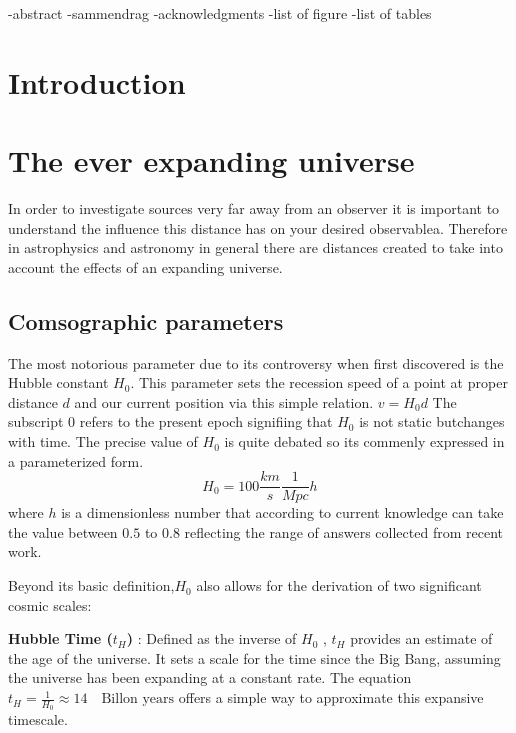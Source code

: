 \documentclass{article}
\begin{document}
\newpage
\tableofcontents

\newpage
\listoffigures

\listoftables

-abstract 
-sammendrag
-acknowledgments
-list of figure
-list of tables

\newpage

\section{Introduction}

\section{The ever expanding universe}
In order to investigate sources very far away from an observer it is important to understand the influence this distance 
has on your desired observablea. Therefore in astrophysics and astronomy in general there are distances created to take into account the effects of an expanding universe. 


\subsection{Comsographic parameters}

The most notorious parameter due to its controversy when first discovered is the Hubble constant $H_0$. 
This parameter sets the recession speed of a point at proper distance $d$ and our current position via this simple relation. $v = H_0 d$ 
The subscript $0$ refers to the present epoch signifiing that $H_0$ is not static butchanges with time. 
The precise value of $H_0$ is quite debated so its commenly expressed in a parameterized form. 
$$
H_0= 100\frac{km}{s}\frac{1}{Mpc} h 
$$
where $h$ is a dimensionless number that according to current knowledge  can take the value between $0.5$ to $0.8$ reflecting the range of answers collected from recent work. 

Beyond its basic definition,$H_0$ also allows for the derivation of two significant cosmic scales:

\textbf{Hubble Time ($t_H$) }: Defined as the inverse of 
$H_0$ , $t_H$ provides an estimate of the age of the universe. 
It sets a scale for the time since the Big Bang, assuming the universe has been expanding at a constant rate. The equation 
$t_H = \frac{1}{H_0} \approx 14 \quad \text{Billon years}$ offers a simple way to approximate this expansive timescale.
\end{document}
